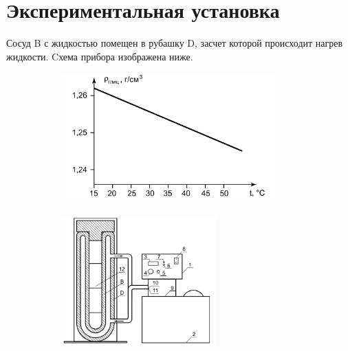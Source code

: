 \section*{Экспериментальная установка}
\indent
Сосуд B с жидкостью помещен в рубашку D, засчет которой происходит нагрев 
жидкости. Cхема прибора изображена ниже. 
\begin{figure}[h!]
    \centering
    \begin{subfigure}{0.45\textwidth}
        \includegraphics[height=5cm]{fluid2.png}
    \end{subfigure}
\hfill
    \begin{subfigure}{0.45\textwidth}
        \includegraphics[height=5cm]{setup.png}
    \end{subfigure}
\end{figure}

%
%
%
%
%

